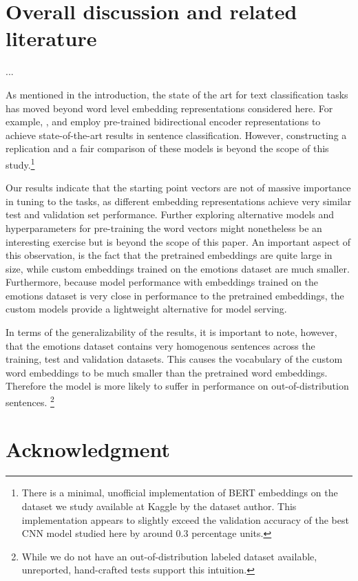 \documentclass[conference]{IEEEtran}
\begin{document}
\section{Overall discussion and related literature}
...

As mentioned in the introduction, the state of the art for text classification tasks has moved beyond word level embedding representations considered here. For example, \cite{bert}, \cite{xlnet} and \cite{bertclassification} employ pre-trained bidirectional encoder representations to achieve state-of-the-art results in sentence classification. However, constructing a replication and a fair comparison of these models is beyond the scope of this study.\footnote{There is a minimal, unofficial implementation of BERT\cite{bert} embeddings on the dataset we study\cite{kaggledata} available at Kaggle by the dataset author. This implementation appears to slightly exceed the validation accuracy of the best CNN model studied here by around 0.3 percentage units.}

Our results indicate that the starting point vectors are not of massive importance in tuning to the tasks, as different embedding representations achieve very similar test and validation set performance. Further exploring alternative models and hyperparameters for pre-training the word vectors might nonetheless be an interesting exercise but is beyond the scope of this paper. An important aspect of this observation, is the fact that the pretrained embeddings are quite large in size, while custom embeddings trained on the emotions dataset are much smaller. Furthermore, because model performance with embeddings trained on the emotions dataset is very close in performance to the pretrained embeddings, the custom models provide a lightweight alternative for model serving. 

In terms of the generalizability of the results, it is important to note, however, that the emotions dataset contains very homogenous sentences across the training, test and validation datasets. This causes the vocabulary of the custom word embeddings to be much smaller than the pretrained word embeddings. Therefore the model is more likely to suffer in performance on out-of-distribution sentences. 
\footnote{While we do not have an out-of-distribution labeled dataset available, unreported, hand-crafted tests support this intuition.}

\section*{Acknowledgment}
\end{document}
